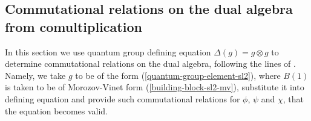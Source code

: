 \documentclass{article}
\newcommand{\lb}{\left (}
\newcommand{\rb}{\right )}
\newcommand{\be}{\begin{eqnarray}}
\newcommand{\ee}{\end{eqnarray}}
\newcommand {\?}{\textit{???}}
\def\dg{\Delta (g)}
\def\gog{g \otimes g}
\newcommand{\matd}[4]{\lb \begin{array}{cc}
#1 & #2 \\ #3 & #4
\end{array} \rb}
\newcommand{\comul}[1]{\Delta \lb #1 \rb}
\newcommand{\delabel}[1]{(\ref{#1})}
\newcommand{\Honed}[1]{\lb \begin{array}{ccc}
#1^{1/2} & 0 \\ 0 & #1^{-1/2}
\end{array} \rb}
\newcommand{\Eoned}[1]{\lb \begin{array}{cc}
1 & #1 \\ 0 & 1
\end{array} \rb}
\newcommand{\Foned}[1]{\lb \begin{array}{cc}
1 & 0 \\ #1 & 1
\end{array} \rb}
\begin{document}





\subsection{Commutational relations on the dual algebra from comultiplication}
\label{comm-relations-dual-algebra-sl2}

In this section we use quantum group defining equation $\dg = \gog$ to determine
commutational relations on the dual algebra, following the lines of \cite{MV1}.
 Namely, we take $g$ to be of the form
\delabel{quantum-group-element-sl2}, where $B(1)$ is taken to be of Morozov-Vinet form
\delabel{building-block-sl2-mv}, substitute it into defining equation and provide
such commutational relations for $\phi$, $\psi$ and $\chi$, that the equation becomes valid.

\end{document}
